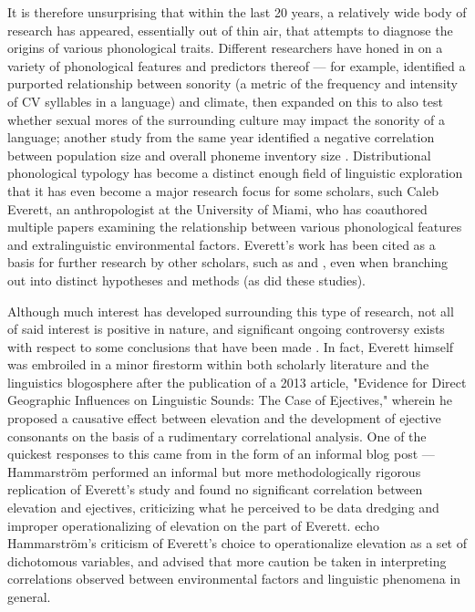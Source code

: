 \documentclass{article}
\begin{document}
It is therefore unsurprising that within the last 20 years, a relatively wide body of research has appeared, essentially out of thin air, that attempts to diagnose the origins of various phonological traits. Different researchers have honed in on a variety of phonological features and predictors thereof — for example, \textcite{fought2004} identified a purported relationship between sonority (a metric of the frequency and intensity of CV syllables in a language) and climate, then \textcite{ember2007} expanded on this to also test whether sexual mores of the surrounding culture may impact the sonority of a language; another study from the same year identified a negative correlation between population size and overall phoneme inventory size \parencite{hay2007}. Distributional phonological typology has become a distinct enough field of linguistic exploration that it has even become a major research focus for some scholars, such Caleb Everett, an anthropologist at the University of Miami, who has coauthored multiple papers \parencite{everett2013,everett2015,everett2016} examining the relationship between various phonological features and extralinguistic environmental factors. Everett's work has been cited as a basis for further research by other scholars, such as \textcite{bentz2018} and \textcite{noelle2020}, even when branching out into distinct hypotheses and methods (as did these studies).

Although much interest has developed surrounding this type of research, not all of said interest is positive in nature, and significant ongoing controversy exists with respect to some conclusions that have been made \parencite{ladd2015}. In fact, Everett himself was embroiled in a minor firestorm within both scholarly literature and the linguistics blogosphere after the publication of a 2013 article, "Evidence for Direct Geographic Influences on Linguistic Sounds: The Case of Ejectives," wherein he proposed a causative effect between elevation and the development of ejective consonants on the basis of a rudimentary correlational analysis. One of the quickest responses to this came from \textcite{hammarstroem2013} in the form of an informal blog post — Hammarström performed an informal but more methodologically rigorous replication of Everett's study and found no significant correlation between elevation and ejectives, criticizing what he perceived to be data dredging and improper operationalizing of elevation on the part of Everett. \textcite{haynie2014,dediu2017} echo Hammarström's criticism of Everett's choice to operationalize elevation as a set of dichotomous variables, and \textcite{haynie2014} advised that more caution be taken in interpreting correlations observed between environmental factors and linguistic phenomena in general.
\end{document}
